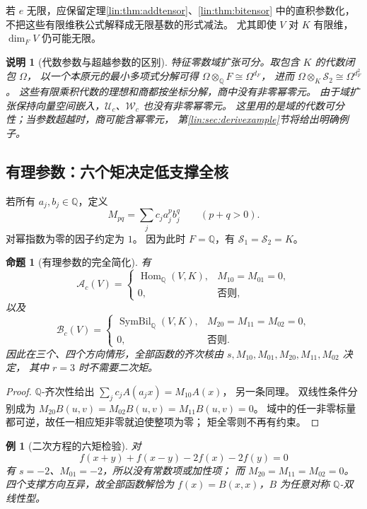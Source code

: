 \documentclass[11pt,a4paper,oneside,openany]{book}
\theoremstyle{lecture}
\newtheorem{proposition}[theorem]{命题}
\newtheorem{example}[theorem]{例}
\newtheorem{remark}[theorem]{说明}
\newcommand{\Q}{\mathbb Q}
\newcommand{\Hom}{\operatorname{Hom}}
\newcommand{\Uc}{\mathscr U_c}
\newcommand{\Wc}{\mathscr W_c}
\numberwithin{equation}{section}
\begin{document}
若 $e$ 无限，应保留定理\ref{lin:thm:addtensor}、\ref{lin:thm:bitensor}
中的直积参数化，不把这些有限维秩公式解释成无限基数的形式减法。
尤其即使 $V$ 对 $K$ 有限维，$\dim_FV$ 仍可能无限。

\begin{remark}[代数参数与超越参数的区别]
特征零数域扩张可分。取包含 $K$ 的代数闭包 $\Omega$，
以一个本原元的最小多项式分解可得
$\Omega\otimes_{\Q}F\cong\Omega^{d_F}$，
进而 $\Omega\otimes_K\mathscr S_2\cong\Omega^{d_F^2}$。
这些有限乘积代数的理想和商都按坐标分解，商中没有非零幂零元。
由于域扩张保持向量空间嵌入，$\Uc$、$\Wc$ 也没有非零幂零元。
这里用的是域的代数可分性；当参数超越时，商可能含幂零元，
第\ref{lin:sec:derivexample}节将给出明确例子。
\end{remark}

\subsection{有理参数：六个矩决定低支撑全核}
若所有 $a_j,b_j\in\Q$，定义
\[
 M_{pq}=\sum_jc_j a_j^p b_j^q\qquad(p+q>0).
\]
对幂指数为零的因子约定为 $1$。
因为此时 $F=\Q$，有 $\mathscr S_1=\mathscr S_2=K$。

\begin{proposition}[有理参数的完全简化]\label{lin:prop:rationalmoments}
有
\[
 \mathcal A_c(V)=
 \begin{cases}
 \Hom_{\Q}(V,K),&M_{10}=M_{01}=0,\\
 0,&\text{否则},
 \end{cases}
\]
以及
\[
 \mathcal B_c(V)=
 \begin{cases}
 \operatorname{SymBil}_{\Q}(V,K),
   &M_{20}=M_{11}=M_{02}=0,\\
 0,&\text{否则}.
 \end{cases}
\]
因此在三个、四个方向情形，全部函数的齐次核由
$s,M_{10},M_{01},M_{20},M_{11},M_{02}$ 决定，
其中 $r=3$ 时不需要二次矩。
\end{proposition}
\begin{proof}
$\Q$-齐次性给出
$\sum_jc_jA(a_jx)=M_{10}A(x)$，
另一条同理。
双线性条件分别成为
$M_{20}B(u,v)=M_{02}B(u,v)=M_{11}B(u,v)=0$。
域中的任一非零标量都可逆，故任一相应矩非零就迫使整项为零；
矩全零则不再有约束。
\end{proof}

\begin{example}[二次方程的六矩检验]
对
\[
 f(x+y)+f(x-y)-2f(x)-2f(y)=0
\]
有 $s=-2$、$M_{01}=-2$，所以没有常数项或加性项；
而
$M_{20}=M_{11}=M_{02}=0$。
四个支撑方向互异，故全部函数解恰为
$f(x)=B(x,x)$，$B$ 为任意对称 $\Q$-双线性型。
\end{example}
\end{document}
